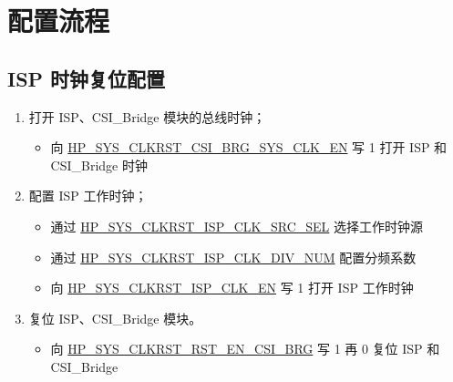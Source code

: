 \documentclass[main\_\_CN.tex]{subfiles}
\begin{document}

\section{配置流程}
\label{sec:isp-prog-procedures}

\subsection{ISP 时钟复位配置}
\label{sec:isp_clkrst_proc}
\begin{enumerate}
    \item 打开 ISP、CSI\_Bridge 模块的总线时钟；
    \begin{itemize}
        \item 向 \hyperref[fielddesc:HPSYSCLKRSTCSIBRGSYSCLKEN]{HP\_SYS\_CLKRST\_CSI\_BRG\_SYS\_CLK\_EN} 写 1 打开 ISP 和 CSI\_Bridge 时钟
    \end{itemize}
    \item 配置 ISP 工作时钟；
    \begin{itemize}
        \item 通过 \hyperref[fielddesc:HPSYSCLKRSTISPCLKSRCSEL]{HP\_SYS\_CLKRST\_ISP\_CLK\_SRC\_SEL} 选择工作时钟源
        \item 通过 \hyperref[fielddesc:HPSYSCLKRSTISPCLKDIVNUM]{HP\_SYS\_CLKRST\_ISP\_CLK\_DIV\_NUM} 配置分频系数
        \item 向 \hyperref[fielddesc:HPSYSCLKRSTISPCLKEN]{HP\_SYS\_CLKRST\_ISP\_CLK\_EN} 写 1 打开 ISP 工作时钟
    \end{itemize}
    \item 复位 ISP、CSI\_Bridge 模块。
    \begin{itemize}
        \item 向 \hyperref[fielddesc:HPSYSCLKRSTRSTENCSIBRG]{HP\_SYS\_CLKRST\_RST\_EN\_CSI\_BRG} 写 1 再 0 复位 ISP 和 CSI\_Bridge
    \end{itemize}
\end{enumerate}
\end{document}
